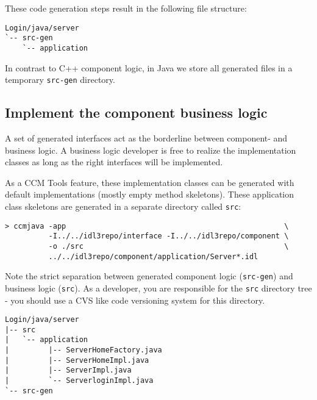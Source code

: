 These code generation steps result in the following file structure:
\begin{footnotesize}
\begin{verbatim}
Login/java/server
`-- src-gen
    `-- application
\end{verbatim}
\end{footnotesize}

In contrast to C++ component logic, in Java we store all generated files in a
temporary {\tt src-gen} directory.


\subsection{Implement the component business logic}
\label{subsection:ImplementBusinessLogicInJava}
A set of generated interfaces act as the borderline between component-
and business logic. A business logic developer is free to realize the
implementation classes as long as the right interfaces will be implemented. 

\vspace{3mm}
As a CCM Tools feature, these implementation classes can be generated with
default implementations (mostly empty method skeletons).
These application class skeletons are generated in a separate directory called
{\tt src}: 
\begin{footnotesize}
\begin{verbatim}
> ccmjava -app                                                  \
          -I../../idl3repo/interface -I../../idl3repo/component \
          -o ./src                                              \
          ../../idl3repo/component/application/Server*.idl      
\end{verbatim}
\end{footnotesize}
Note the strict separation between generated component logic ({\tt src-gen})
and business logic ({\tt src}). 
As a developer, you are responsible for the {\tt src} directory tree - you
should use a CVS like code versioning system for this directory.
\begin{footnotesize}
\begin{verbatim}
Login/java/server
|-- src
|   `-- application
|         |-- ServerHomeFactory.java
|         |-- ServerHomeImpl.java
|         |-- ServerImpl.java
|         `-- ServerloginImpl.java
`-- src-gen
\end{verbatim}
\end{footnotesize}

